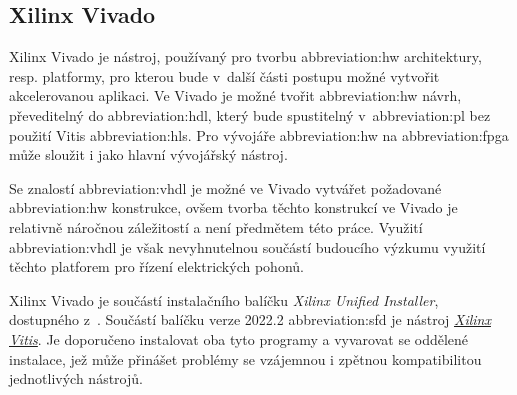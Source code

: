 \documentclass[a4paper, twoside, 11pt]{article}
\begin{document}
		\subsection{Xilinx Vivado}\label{subsec:xilinx-vivado}
			Xilinx Vivado je nástroj, používaný pro tvorbu \gls{abbreviation:hw} architektury, resp. platformy, pro kterou bude v~další části postupu možné vytvořit akcelerovanou aplikaci. Ve Vivado je možné tvořit \gls{abbreviation:hw} návrh, převeditelný do \gls{abbreviation:hdl}, který bude spustitelný v~\gls{abbreviation:pl} bez použití Vitis \gls{abbreviation:hls}. Pro vývojáře \gls{abbreviation:hw} na \gls{abbreviation:fpga} může sloužit i jako hlavní vývojářský nástroj.\par
			Se znalostí \gls{abbreviation:vhdl} je možné ve Vivado vytvářet požadované \gls{abbreviation:hw} konstrukce, ovšem tvorba těchto konstrukcí ve Vivado je relativně náročnou záležitostí a není předmětem této práce. Využití \gls{abbreviation:vhdl} je však nevyhnutelnou součástí budoucího výzkumu využití těchto platforem pro řízení elektrických pohonů.\par
			Xilinx Vivado je součástí instalačního balíčku \textit{Xilinx Unified Installer}, dostupného z~\cite{xilinx-downloads}. Součástí balíčku verze 2022.2 \gls{abbreviation:sfd} je nástroj \hyperref[subsec:xilinx-vitis]{\textit{Xilinx Vitis}}. Je doporučeno instalovat oba tyto programy a vyvarovat se oddělené instalace, jež může přinášet problémy se vzájemnou i zpětnou kompatibilitou jednotlivých nástrojů.
\end{document}
